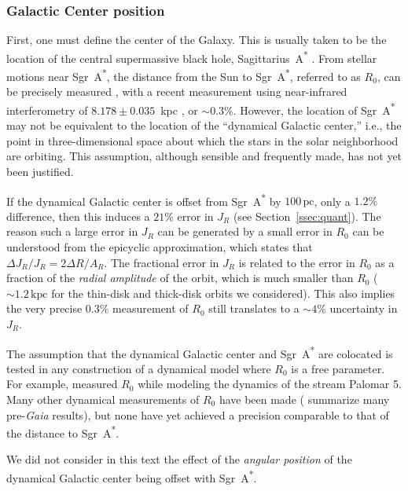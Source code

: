 \documentclass[twocolumn]{aastex62}
\newcommand{\pc}{\text{pc}}
\newcommand{\kpc}{\text{kpc}}
\newcommand{\sgra}{Sgr~A\textsuperscript{*}}
\begin{document}
\subsubsection{Galactic Center position}
First, one must define the center of the Galaxy. This is usually taken to be
the location of the central supermassive black hole, Sagittarius~A\textsuperscript{*}
\citep[\sgra{}, e.g.][]{2004ApJ...616..872R}. From stellar motions near
\sgra{}, the distance from the Sun to \sgra{}, referred to as $R_0$, can be
precisely measured \citep{2009ApJ...692.1075G, 2018AA...615L..15G}, with a
recent measurement using near-infrared interferometry of $8.178 \pm 0.035$~kpc
\citep{2019arXiv190405721A}, or $\sim0.3\%$. However, the location of \sgra{} may not be equivalent to the location of the ``dynamical Galactic center,'' i.e., the
point in three-dimensional space about which the stars in the solar
neighborhood are orbiting. This assumption, although sensible and frequently
made, has not yet been justified.

If the dynamical Galactic center is offset from \sgra{} by $100\,\pc$, only a
$1.2\%$ difference, then this induces a $21\%$ error in $J_R$ (see
Section~\ref{ssec:quant}). The reason such a large error in $J_R$ can be
generated by a small error in $R_0$ can be understood from the epicyclic
approximation, which states that $\Delta J_R/J_R = 2\Delta R/A_R$. The
fractional error in $J_R$ is related to the error in $R_0$ as a fraction of
the {\em radial amplitude} of the orbit, which is much smaller than $R_0$
($\sim1.2\,\kpc$ for the thin-disk and thick-disk orbits we considered). This
also implies the very precise $0.3\%$ measurement of $R_0$ still translates to
a $\sim4\%$ uncertainty in $J_R$.

The assumption that the dynamical Galactic center and \sgra{} are colocated is
tested in any construction of a dynamical model where $R_0$ is a free
parameter. For example, \citet{2015ApJ...803...80K} measured $R_0$ while
modeling the dynamics of the stream Palomar 5. Many other dynamical
measurements of $R_0$ have been made (\citealt{2016ARAA..54..529B} summarize
many pre-\textit{Gaia} results), but none have yet achieved a precision
comparable to that of the distance to \sgra{}.

We did not consider in this text the effect of the \emph{angular position} of
the dynamical Galactic center being offset with \sgra{}.
\end{document}
